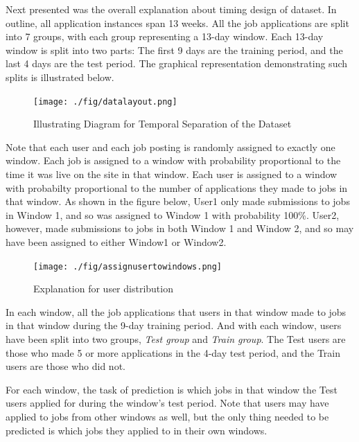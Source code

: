 \documentclass{article} %
\begin{document}
Next presented was the overall explanation about timing design of dataset. In
outline, all application instances span 13 weeks. All the job applications are
split into 7 groups, with each group representing a 13-day window. Each 13-day
window is split into two parts: The first 9 days are the training period, and
the last 4 days are the test period. The graphical representation
demonstrating such splits is illustrated below.
\begin{figure}[h]
    \begin{center}
        \texttt{[image: ./fig/datalayout.png]}
        \caption{Illustrating Diagram for Temporal Separation of the Dataset}
    \end{center}
\end{figure}

Note that each user and each job posting is randomly assigned to exactly one window.
Each job is assigned to a window with probability proportional to the time it
was live on the site in that window. Each user is assigned to a window with
probabilty proportional to the number of applications they made to jobs in
that window. As shown in the figure below, User1 only made submissions to jobs in
Window 1, and so was assigned to Window 1 with probability 100\%. User2,
however, made submissions to jobs in both Window 1 and Window 2, and so may
have been assigned to either Window1 or Window2.

\begin{figure}[h]
    \begin{center}
        \texttt{[image: ./fig/assignusertowindows.png]}
        \caption{Explanation for user distribution}
    \end{center}
\end{figure}

In each window, all the job applications that users in that window made to
jobs in that window during the 9-day training period. 
And with each window, users have been split into two groups, {\it Test group}
and {\it Train group}. The Test users are those who made 5 or more
applications in the 4-day test period, and the Train users are those who did
not.

For each window, the task of prediction is which jobs in that window the Test
users applied for during the window's test period. Note that users may have
applied to jobs from other windows as well, but the only thing needed to be
predicted is which jobs they applied to in their own windows.

\end{document}
